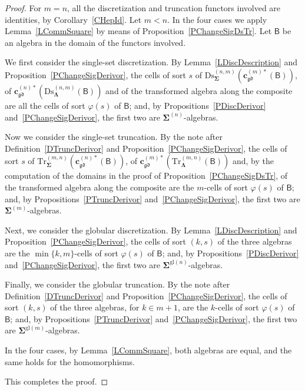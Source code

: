 \documentclass[a4paper, reqno
]{amsart}
\newcommand{\sig}[1]{\mathbf{#1}}             %
\newcommand{\calg}[1]{\boldsymbol{\mathsf{#1}}} %
\newcommand{\gd}{\mathfrak{gd}}              %
\newcommand{\gl}{\mathrm{gl}}                %
\newcommand{\Ds}{\mathrm{Ds}}
\newcommand{\Tr}{\mathrm{Tr}}
\theoremstyle{plain}
\theoremstyle{definition}
\begin{document}
\begin{proof}
For $m=n$, all the discretization and truncation functors involved are identities, by Corollary~\ref{CHepId}.
Let $m<n$.
In the four cases we apply Lemma~\ref{LCommSquare} by means of Proposition~\ref{PChangeSigDsTr}.
Let $\calg{B}$ be an algebra in the domain of the functors involved.

We first consider the single-set discretization.
By Lemma~\ref{LDiscDescription} and Proposition~\ref{PChangeSigDerivor}, the cells of sort $s$ of $\Ds^{(n,m)}_{\sig{\Sigma}}(\mathbf{c}^{(m)\ast}_{\gd}(\calg{B}))$, of $\mathbf{c}^{(n)\ast}_{\gd}(\Ds^{(n,m)}_{\sig{\Lambda}}(\calg{B}))$ and of the transformed algebra along the composite are all the cells of sort $\varphi(s)$ of $\calg{B}$; and, by Propositions~\ref{PDiscDerivor} and~\ref{PChangeSigDerivor}, the first two are $\sig{\Sigma}^{(n)}$-algebras.

Now we consider the single-set truncation.
By the note after Definition~\ref{DTruncDerivor} and Proposition~\ref{PChangeSigDerivor}, the cells of sort $s$ of $\Tr^{(m,n)}_{\sig{\Sigma}}(\mathbf{c}^{(n)\ast}_{\gd}(\calg{B}))$, of $\mathbf{c}^{(m)\ast}_{\gd}(\Tr^{(m,n)}_{\sig{\Lambda}}(\calg{B}))$ and, by the computation of the domains in the proof of Proposition~\ref{PChangeSigDsTr}, of the transformed algebra along the composite are the $m$-cells of sort $\varphi(s)$ of $\calg{B}$; and, by Propositions~\ref{PTruncDerivor} and~\ref{PChangeSigDerivor}, the first two are $\sig{\Sigma}^{(m)}$-algebras.

Next, we consider the globular discretization.
By Lemma~\ref{LDiscDescription} and Proposition~\ref{PChangeSigDerivor}, the cells of sort $(k,s)$ of the three algebras are the $\min\{k,m\}$-cells of sort $\varphi(s)$ of $\calg{B}$; and, by Propositions~\ref{PDiscDerivor} and~\ref{PChangeSigDerivor}, the first two are $\sig{\Sigma}^{\gl(n)}$-algebras.

Finally, we consider the globular truncation.
By the note after Definition~\ref{DTruncDerivor} and Proposition~\ref{PChangeSigDerivor}, the cells of sort $(k,s)$ of the three algebras, for $k\in m+1$, are the $k$-cells of sort $\varphi(s)$ of $\calg{B}$; and, by Propositions~\ref{PTruncDerivor} and~\ref{PChangeSigDerivor}, the first two are $\sig{\Sigma}^{\gl(m)}$-algebras.

In the four cases, by Lemma~\ref{LCommSquare}, both algebras are equal, and the same holds for the homomorphisms.

This completes the proof.
\end{proof}
\end{document}
